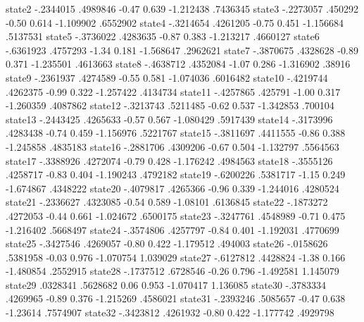       state2 {\VBAR}  -.2344015   .4989846    -0.47   0.639    -1.212438    .7436345
      state3 {\VBAR}  -.2273057    .450292    -0.50   0.614    -1.109902    .6552902
      state4 {\VBAR}  -.3214654   .4261205    -0.75   0.451    -1.156684    .5137531
      state5 {\VBAR}  -.3736022   .4283635    -0.87   0.383    -1.213217    .4660127
      state6 {\VBAR}  -.6361923   .4757293    -1.34   0.181    -1.568647    .2962621
      state7 {\VBAR}  -.3870675   .4328628    -0.89   0.371    -1.235501    .4613663
      state8 {\VBAR}  -.4638712   .4352084    -1.07   0.286    -1.316902      .38916
      state9 {\VBAR}  -.2361937   .4274589    -0.55   0.581    -1.074036    .6016482
     state10 {\VBAR}  -.4219744   .4262375    -0.99   0.322    -1.257422    .4134734
     state11 {\VBAR}  -.4257865    .425791    -1.00   0.317    -1.260359    .4087862
     state12 {\VBAR}  -.3213743   .5211485    -0.62   0.537    -1.342853     .700104
     state13 {\VBAR}  -.2443425   .4265633    -0.57   0.567    -1.080429    .5917439
     state14 {\VBAR}  -.3173996   .4283438    -0.74   0.459    -1.156976    .5221767
     state15 {\VBAR}  -.3811697   .4411555    -0.86   0.388    -1.245858    .4835183
     state16 {\VBAR}  -.2881706   .4309206    -0.67   0.504    -1.132797    .5564563
     state17 {\VBAR}  -.3388926   .4272074    -0.79   0.428    -1.176242    .4984563
     state18 {\VBAR}  -.3555126   .4258717    -0.83   0.404    -1.190243    .4792182
     state19 {\VBAR}  -.6200226   .5381717    -1.15   0.249    -1.674867    .4348222
     state20 {\VBAR}  -.4079817   .4265366    -0.96   0.339    -1.244016    .4280524
     state21 {\VBAR}  -.2336627   .4323085    -0.54   0.589     -1.08101    .6136845
     state22 {\VBAR}  -.1873272   .4272053    -0.44   0.661    -1.024672    .6500175
     state23 {\VBAR}  -.3247761   .4548989    -0.71   0.475    -1.216402    .5668497
     state24 {\VBAR}  -.3574806   .4257797    -0.84   0.401    -1.192031    .4770699
     state25 {\VBAR}  -.3427546   .4269057    -0.80   0.422    -1.179512     .494003
     state26 {\VBAR}  -.0158626   .5381958    -0.03   0.976    -1.070754    1.039029
     state27 {\VBAR}  -.6127812   .4428824    -1.38   0.166    -1.480854    .2552915
     state28 {\VBAR}  -.1737512   .6728546    -0.26   0.796    -1.492581    1.145079
     state29 {\VBAR}   .0328341   .5628682     0.06   0.953    -1.070417    1.136085
     state30 {\VBAR}  -.3783334   .4269965    -0.89   0.376    -1.215269    .4586021
     state31 {\VBAR}  -.2393246   .5085657    -0.47   0.638     -1.23614    .7574907
     state32 {\VBAR}  -.3423812   .4261932    -0.80   0.422    -1.177742    .4929798
